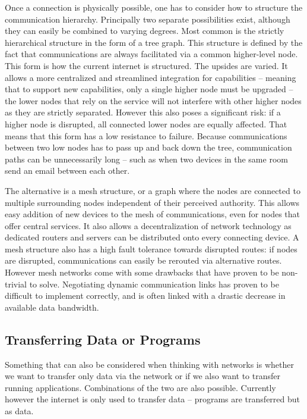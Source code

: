 Once a connection is physically possible, one has to consider how to structure the communication hierarchy.
Principally two separate possibilities exist, although they can easily be combined to varying degrees.
Most common is the strictly hierarchical structure in the form of a tree graph.
This structure is defined by the fact that communications are always facilitated via a common higher-level node.
This form is how the current internet is structured.
The upsides are varied.
It allows a more centralized and streamlined integration for capabilities – meaning that to support new capabilities, only a single higher node must be upgraded – the lower nodes that rely on the service will not interfere with other higher nodes as they are strictly separated.
However this also poses a significant risk: if a higher node is disrupted, all connected lower nodes are equally affected.
That means that this form has a low resistance to failure.
Because communications between two low nodes has to pass up and back down the tree, communication paths can be unnecessarily long – such as when two devices in the same room send an email between each other.

The alternative is a mesh structure, or a graph where the nodes are connected to multiple surrounding nodes independent of their perceived authority.
This allows easy addition of new devices to the mesh of communications, even for nodes that offer central services.
It also allows a decentralization of network technology as dedicated routers and servers can be distributed onto every connecting device.
A mesh structure also has a high fault tolerance towards disrupted routes: if nodes are disrupted, communications can easily be rerouted via alternative routes.
However mesh networks come with some drawbacks that have proven to be non-trivial to solve.
Negotiating dynamic communication links has proven to be difficult to implement correctly, and is often linked with a drastic decrease in available data bandwidth.

\subsection{Transferring Data or Programs}

Something that can also be considered when thinking with networks is whether we want to transfer only data via the network or if we also want to transfer running applications.
Combinations of the two are also possible.
Currently however the internet is only used to transfer data – programs are transferred but as data.